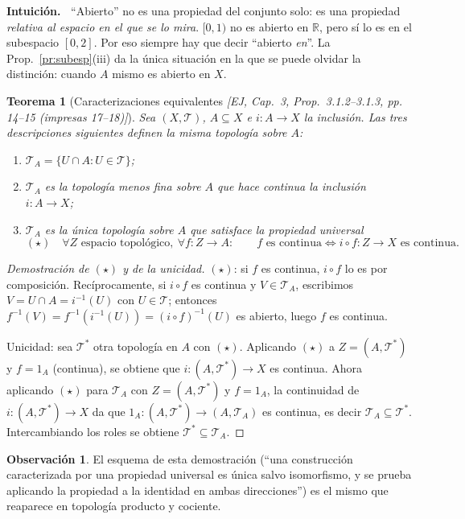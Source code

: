 \documentclass[11pt,a4paper]{article}
\newenvironment{intuicion}{\begin{cajaint}\small\textbf{Intuición.\ }}{\end{cajaint}}
\theoremstyle{definition}
\newtheorem{observacion}[definicion]{Observación}
\theoremstyle{plain}
\newtheorem{teorema}[definicion]{Teorema}
\newcommand{\fnt}[1]{{\normalfont\small\itshape\color{gray!150!black}[#1]}}
\newcommand{\R}{\mathbb{R}}
\newcommand{\tp}{\mathcal{T}}
\begin{document}
\begin{intuicion}
``Abierto'' no es una propiedad del conjunto solo: es una propiedad \emph{relativa al espacio en el que se lo mira}. $[0,1)$ no es abierto en $\R$, pero sí lo es en el subespacio $[0,2]$. Por eso siempre hay que decir ``abierto \emph{en}''. La Prop.~\ref{pr:subesp}(iii) da la única situación en la que se puede olvidar la distinción: cuando $A$ mismo es abierto en $X$.
\end{intuicion}

\begin{teorema}[Caracterizaciones equivalentes \fnt{EJ, Cap.\ 3, Prop.\ 3.1.2--3.1.3, pp.\,14--15 (impresas 17--18)}]
Sea $(X,\tp)$, $A\subseteq X$ e $i:A\to X$ la inclusión. Las tres descripciones siguientes definen la misma topología sobre $A$:
\begin{enumerate}[label=(\arabic*),leftmargin=2.2em,itemsep=0pt]
\item $\tp_A=\{U\cap A: U\in\tp\}$;
\item $\tp_A$ es la topología \emph{menos fina} sobre $A$ que hace continua la inclusión $i:A\to X$;
\item $\tp_A$ es la \emph{única} topología sobre $A$ que satisface la propiedad universal
\[
(\star)\quad \forall Z \text{ espacio topológico},\ \forall f:Z\to A:\qquad f \text{ es continua} \iff i\circ f:Z\to X \text{ es continua}.
\]
\end{enumerate}
\end{teorema}

\begin{proof}[Demostración de $(\star)$ y de la unicidad]
$(\star)$: si $f$ es continua, $i\circ f$ lo es por composición. Recíprocamente, si $i\circ f$ es continua y $V\in\tp_A$, escribimos $V=U\cap A=i^{-1}(U)$ con $U\in\tp$; entonces $f^{-1}(V)=f^{-1}(i^{-1}(U))=(i\circ f)^{-1}(U)$ es abierto, luego $f$ es continua.

Unicidad: sea $\tp^\ast$ otra topología en $A$ con $(\star)$. Aplicando $(\star)$ a $Z=(A,\tp^\ast)$ y $f=1_A$ (continua), se obtiene que $i:(A,\tp^\ast)\to X$ es continua. Ahora aplicando $(\star)$ para $\tp_A$ con $Z=(A,\tp^\ast)$ y $f=1_A$, la continuidad de $i:(A,\tp^\ast)\to X$ da que $1_A:(A,\tp^\ast)\to (A,\tp_A)$ es continua, es decir $\tp_A\subseteq\tp^\ast$. Intercambiando los roles se obtiene $\tp^\ast\subseteq\tp_A$.
\end{proof}

\begin{observacion}
El esquema de esta demostración (``una construcción caracterizada por una propiedad universal es única salvo isomorfismo, y se prueba aplicando la propiedad a la identidad en ambas direcciones'') es el mismo que reaparece en topología producto y cociente.
\end{observacion}
\end{document}
